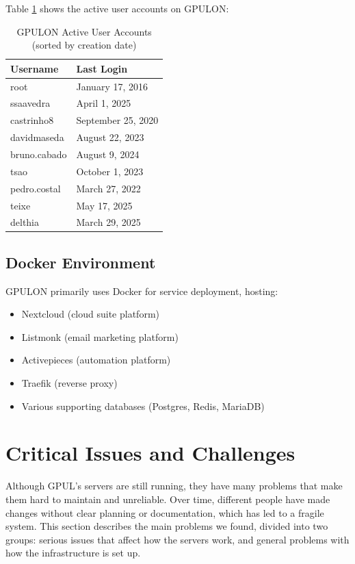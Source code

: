 Table \ref{tab:gpulon_users} shows the active user accounts on GPULON:

\begin{table}[H]
  \centering
  \caption{GPULON Active User Accounts (sorted by creation date)}
  \label{tab:gpulon_users}
  \begin{tabular}{ll}
    \rowcolor{udcpink!25}
    \textbf{Username} & \textbf{Last Login} \\
    \hline
    root & January 17, 2016 \\
    ssaavedra & April 1, 2025 \\
    castrinho8 & September 25, 2020 \\
    davidmaseda & August 22, 2023 \\
    bruno.cabado & August 9, 2024 \\
    tsao & October 1, 2023 \\
    pedro.costal & March 27, 2022 \\
    teixe & May 17, 2025 \\
    delthia & March 29, 2025 \\
  \end{tabular}
\end{table}

\subsection{Docker Environment}

GPULON primarily uses Docker for service deployment, hosting:
\begin{itemize}
  \item Nextcloud (cloud suite platform)
  \item Listmonk (email marketing platform)
  \item Activepieces (automation platform)
  \item Traefik (reverse proxy)
  \item Various supporting databases (Postgres, Redis, MariaDB)
\end{itemize}

\section{Critical Issues and Challenges}

Although GPUL's servers are still running, they have many problems that make them hard to maintain and unreliable. Over time, different people have made changes without clear planning or documentation, which has led to a fragile system. This section describes the main problems we found, divided into two groups: serious issues that affect how the servers work, and general problems with how the infrastructure is set up.

